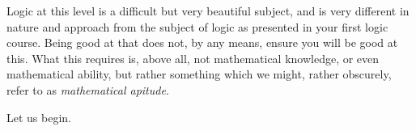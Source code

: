Logic at this level is a difficult but very beautiful subject, and is
very different in nature and approach from the subject of logic as
presented in your first logic course. Being good at that does not, by
any means, ensure you will be good at this. What this requires is,
above all, not mathematical knowledge, or even mathematical ability,
but rather something which we might, rather obscurely, refer to as
\emph{mathematical apitude}. 

Let us begin.



